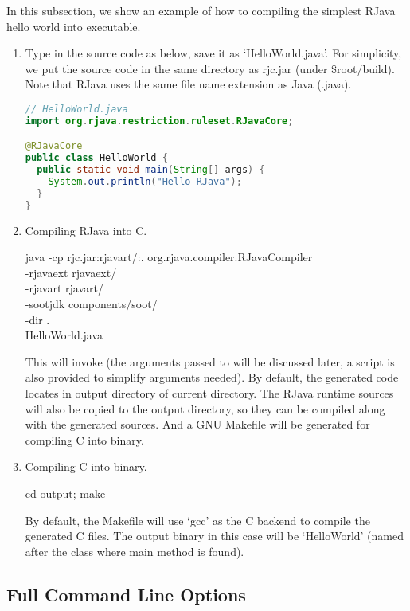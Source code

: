 \documentclass[12pt]{article}
\begin{document}
In this subsection, we show an example of how to compiling
the simplest RJava hello world into executable. 

\begin{enumerate}
\item Type in the source code as below, save it as `HelloWorld.java'. 
For simplicity, we put the source code in the same directory as rjc.jar
(under \$root/build). 
Note that RJava uses the same file name extension as Java (.java). 

\begin{lstlisting}[language=java]
// HelloWorld.java
import org.rjava.restriction.ruleset.RJavaCore;

@RJavaCore
public class HelloWorld {
  public static void main(String[] args) {
    System.out.println("Hello RJava");
  }
}
\end{lstlisting}

\item Compiling RJava into C. 
\begin{cmd}
java -cp rjc.jar:rjava\textunderscore rt/:. org.rjava.compiler.RJavaCompiler \\
-rjava\textunderscore ext rjava\textunderscore ext/ \\
-rjava\textunderscore rt rjava\textunderscore rt/ \\
-soot\textunderscore jdk components/soot/ \\
-dir . \\
HelloWorld.java
\end{cmd}
This will invoke \rjcfull (the arguments passed to \rjc will be discussed later, 
a script is also provided to simplify arguments needed). 
By default, the generated code locates in output directory of current directory. 
The RJava runtime sources will also be copied to the output directory, so they
can be compiled along with the generated sources. And
a GNU Makefile will be generated for compiling C into binary. 

\item Compiling C into binary.
\begin{cmd}
cd output; make
\end{cmd}
By default, the Makefile will use `gcc' as the C backend to compile the generated
C files. The output binary in this case will be `HelloWorld' (named after the class
where main method is found). 

\end{enumerate}

\subsection{Full Command Line Options}
\end{document}
